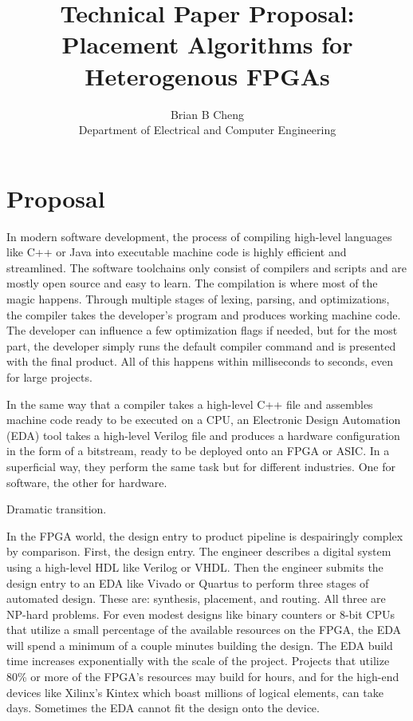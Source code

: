 \documentclass{article}
\begin{document}
\title{Technical Paper Proposal: \\ Placement Algorithms for Heterogenous FPGAs}
\author{Brian B Cheng \\ Department of Electrical and Computer Engineering}


\date{}
\maketitle

\section{Proposal}

In modern software development, the process of compiling high-level languages like C++ or Java into executable machine code is highly efficient and streamlined. 
The software toolchains only consist of compilers and scripts and are mostly open source and easy to learn. 
The compilation is where most of the magic happens.
Through multiple stages of lexing, parsing, and optimizations, the compiler takes the developer's program and produces working machine code.
The developer can influence a few optimization flags if needed, but for the most part, the developer simply runs the default compiler command and is presented with the final product.
All of this happens within milliseconds to seconds, even for large projects. 

In the same way that a compiler takes a high-level C++ file and assembles machine code ready to be executed on a CPU, an Electronic Design Automation (EDA) tool takes a high-level Verilog file and produces a hardware configuration in the form of a bitstream, ready to be deployed onto an FPGA or ASIC. In a superficial way, they perform the same task but for different industries. 
One for software, the other for hardware.

Dramatic transition.

In the FPGA world, the design entry to product pipeline is despairingly complex by comparison. 
First, the design entry. The engineer describes a digital system using a high-level HDL like Verilog or VHDL. 
Then the engineer submits the design entry to an EDA like Vivado or Quartus to perform three stages of automated design. 
These are: synthesis, placement, and routing. 
All three are NP-hard problems.
For even modest designs like binary counters or 8-bit CPUs that utilize a small percentage of the available resources on the FPGA, the EDA will spend a minimum of a couple minutes building the design.
The EDA build time increases exponentially with the scale of the project. 
Projects that utilize 80\% or more of the FPGA's resources may build for hours, and for the high-end devices like Xilinx's Kintex which boast millions of logical elements, can take days.
Sometimes the EDA cannot fit the design onto the device.
\end{document}
